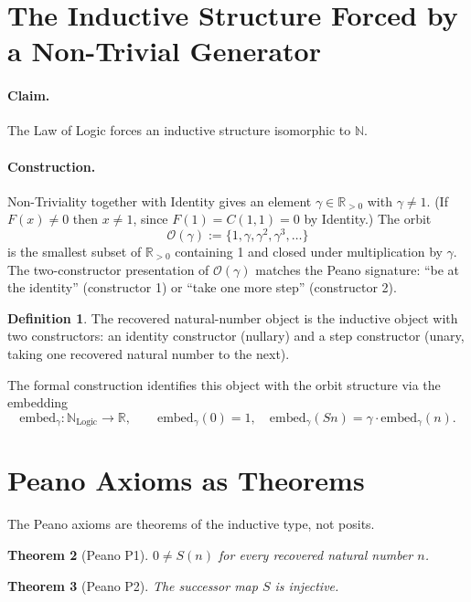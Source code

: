 \documentclass[11pt,a4paper]{article}
\newtheorem{theorem}{Theorem}
\theoremstyle{definition}
\newtheorem{definition}[theorem]{Definition}
\theoremstyle{remark}
\begin{document}
\section{The Inductive Structure Forced by a Non-Trivial Generator}
\label{sec:inductive}

\paragraph{Claim.} The Law of Logic forces an inductive structure
isomorphic to $\mathbb{N}$.

\paragraph{Construction.} Non-Triviality together with Identity gives
an element $\gamma \in \mathbb{R}_{>0}$ with $\gamma \neq 1$. (If
$F(x) \neq 0$ then $x \neq 1$, since $F(1) = C(1, 1) = 0$ by
Identity.) The orbit
\[
\mathcal{O}(\gamma) := \{1, \gamma, \gamma^2, \gamma^3, \dots\}
\]
is the smallest subset of $\mathbb{R}_{>0}$ containing 1 and closed
under multiplication by $\gamma$. The two-constructor presentation of
$\mathcal{O}(\gamma)$ matches the Peano signature: ``be at the
identity'' (constructor 1) or ``take one more step'' (constructor 2).

\begin{definition}
The recovered natural-number object is the inductive object with two
constructors: an identity constructor (nullary) and a step constructor
(unary, taking one recovered natural number to the next).
\end{definition}

The formal construction identifies this object with the orbit
structure via the embedding
\[
\mathrm{embed}_\gamma : \mathbb{N}_{\mathrm{Logic}} \to \mathbb{R}, \qquad
\mathrm{embed}_\gamma(0) = 1, \quad
\mathrm{embed}_\gamma(Sn) = \gamma \cdot \mathrm{embed}_\gamma(n).
\]

\section{Peano Axioms as Theorems}
\label{sec:peano}

The Peano axioms are theorems of the inductive type, not posits.

\begin{theorem}[Peano P1]
$0 \neq S(n)$ for every recovered natural number $n$.
\end{theorem}

\begin{theorem}[Peano P2]
The successor map $S$ is injective.
\end{theorem}
\end{document}
